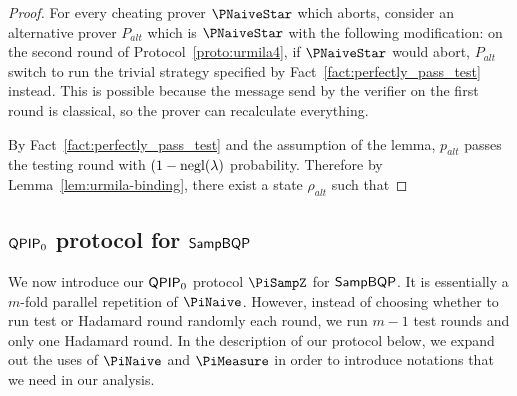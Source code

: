 \begin{proof}
For every cheating prover $\PNaiveStar$ which aborts, consider an alternative prover $P_{alt}$ which is $\PNaiveStar$ with the following modification: on the second round of Protocol~\ref{proto:urmila4}, if $\PNaiveStar$ would abort, $P_{alt}$ switch to run the trivial strategy specified by Fact~\ref{fact:perfectly_pass_test} instead. This is possible because the message send by the verifier on the first round is classical, so the prover can recalculate everything.

By Fact~\ref{fact:perfectly_pass_test} and the assumption of the lemma, $p_{alt}$ passes the testing round with $(1-\operatorname{negl}(\lambda)$ probability. Therefore by Lemma~\ref{lem:urmila-binding}, there exist a state $\rho_{alt}$ such that 

\end{proof}


\subsection{$\QPIP_0$ protocol for $\SampBQP$} \label{sec:qpip0}

\iffalse
The following protocol is a $\QPIP_0$ protocol for $\SampBQP$

$\forall c\in\bbN$ Soundness = $O(T^{-c})$

Given inverse poly p(T), we can parameterize the protocol to have soundness p(T)
\fi


We now introduce our $\QPIP_0$ protocol $\PiSampZ$ for $\SampBQP$.
It is essentially a $m$-fold parallel repetition of $\PiNaive$.
However, instead of choosing whether to run test or Hadamard round randomly each round,
we run $m-1$ test rounds and only one Hadamard round.
In the description of our protocol below, we expand out the uses of $\PiNaive$ and $\PiMeasure$ in order to introduce notations that we need in our analysis.

